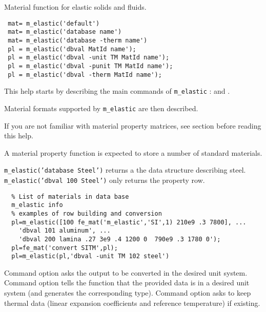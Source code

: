 

 Material function for elastic solids and fluids.

\rsyntax\begin{verbatim}
 mat= m_elastic('default') 
 mat= m_elastic('database name') 
 mat= m_elastic('database -therm name') 
 pl = m_elastic('dbval MatId name');
 pl = m_elastic('dbval -unit TM MatId name');
 pl = m_elastic('dbval -punit TM MatId name');
 pl = m_elastic('dbval -therm MatId name');
\end{verbatim}


This help starts by describing the main commands of {\tt m\_elastic} :  and . 

Material formats supported by {\tt m\_elastic} are then described.

If you are not familiar with material property matrices, see section  before reading this help.

\ruic{m\_elastic}{Database}{,\htr{m\_elastic}{Dbval}] [-unit TY] [,MatiD]] Name} %

A material property function is expected to store a number of standard materials.

{\tt m\_elastic('database Steel')} returns a the data structure describing steel.\\
{\tt m\_elastic('dbval 100 Steel')} only returns the property row. 

\begin{verbatim}
  % List of materials in data base
  m_elastic info
  % examples of row building and conversion
  pl=m_elastic([100 fe_mat('m_elastic','SI',1) 210e9 .3 7800], ...
    'dbval 101 aluminum', ...
    'dbval 200 lamina .27 3e9 .4 1200 0  790e9 .3 1780 0');
  pl=fe_mat('convert SITM',pl);
  pl=m_elastic(pl,'dbval -unit TM 102 steel')
\end{verbatim}%

Command option  asks the output to be converted in the desired unit system.
Command option  tells the function that the provided data is in a desired unit system (and generates the corresponding type).
Command option  asks to keep thermal data (linear expansion coefficients and reference temperature) if existing.

